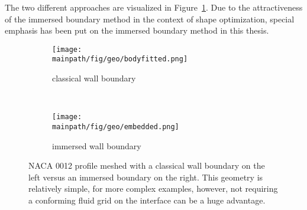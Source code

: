 \documentclass[../main.tex]{subfiles}
\begin{document}
The two different approaches are visualized in Figure~\ref{fig:ale_vs_embedded}.
Due to the attractiveness of the immersed boundary method in the context of shape optimization, special emphasis has been put on the immersed boundary method in this thesis.


\begin{figure}
\centering
			    \begin{subfigure}[t]{0.4\textwidth}
			        \centering
			        \texttt{[image: \\mainpath/fig/geo/bodyfitted.png]}
			        \caption{classical wall boundary}
			    \end{subfigure}~
			    	\begin{subfigure}[t]{0.4\textwidth}
			        \centering
			        \texttt{[image: \\mainpath/fig/geo/embedded.png]}
			        \caption{immersed wall boundary}
			    \end{subfigure}%
\caption[Body-fitted vs. immersed wall boundary]{NACA 0012 profile meshed with a classical wall boundary on the left versus an immersed boundary on the right. This geometry is relatively simple, for more complex examples, however, not requiring a conforming fluid grid on the interface can be a huge advantage.}
\label{fig:ale_vs_embedded}
\end{figure}
\end{document}
